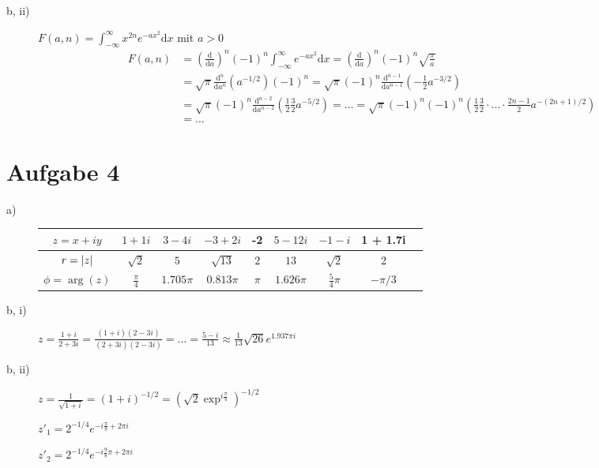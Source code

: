 \begin{description}
	\item[b, ii)]  $F(a, n) = \int^\infty_{-\infty} x^{2n} e^{-ax^2} \mathrm{d} x$ mit $a > 0$
	\begin{align*}
			F(a, n) 
			&= \left( \frac{\mathrm{d}}{\mathrm{d} a} \right)^n (-1)^n \int^{\infty}_{-\infty} e^{-ax^2} \mathrm{d} x
			= \left( \frac{\mathrm{d}}{\mathrm{d} a} \right)^n (-1)^n \sqrt{\frac{\pi}{a}} \\
			&=  \sqrt{\pi} \frac{\mathrm{d}^n}{\mathrm{d} a^n} \left( a^{-1/2} \right) (-1)^n
			= \sqrt{\pi} (-1)^n \frac{\mathrm{d}^{n -1}}{\mathrm{d} a^{n - 1}} \left( -\frac{1}{2} a^{-3/2} \right) \\
			&= \sqrt{\pi} (-1)^n \frac{\mathrm{d}^{n - 2}}{\mathrm{d} a^{n - 2}} \left( \frac{1}{2} \frac{3}{2} a^{-5/2} \right) 
			= \dots 
			= \sqrt{\pi} (-1)^n (-1)^n \left( \frac{1}{2} \frac{3}{2} \cdot \hdots \cdot \frac{2n - 1}{2} a^{-(2n + 1)/2} \right) \\
			&= \dots
	\end{align*}
\end{description}

\section*{Aufgabe 4}

\begin{description}
	\item[a)] 
	\begin{tabular}{|c||c|c|c|c|c|c|c|c|}
		\hline 
		$z = x + iy$ & $1 + 1i$ & $3 - 4i$ & $-3 + 2i$ & -2 & $5 - 12 i$ & $-1 - i$ & 1 + 1.7i \\
		\hline
		$r = \left\lvert z \right\rvert$ & $\sqrt{2}$ & $5$ & $\sqrt{13}$ & $2$ & $13$ & $\sqrt{2}$ & 2 \\
		\hline 
		$\phi = \arg(z)$ & $\frac{\pi}{4}$ & $1.705 \pi$ & $0.813 \pi$ & $\pi$ & $1.626 \pi$ & $\frac{5}{4} \pi$ & $-\pi/3$ \\
		\hline 
	\end{tabular}
 
	\item[b, i)] $z = \frac{1 + i}{2 + 3i} = \frac{(1 + i)(2 - 3i)}{(2 + 3i)(2 - 3i)} = \dots = \frac{5 - i}{13} \approx \frac{1}{13} \sqrt{26} e^{1.937 \pi i}$
	
	\item[b, ii)] $z = \frac{1}{\sqrt{1 + i}} = (1 + i)^{-1/2} = \left( \sqrt{2}\exp^{i \frac{\pi}{4}} \right)^{-1/2}$
	
		$z'_1 = 2^{-1/4} e^{-i \frac{\pi}{8} + 2 \pi i}$
		
		$z'_2 = 2^{-1/4} e^{-i \frac{9}{8} \pi + 2 \pi i}$
\end{description}